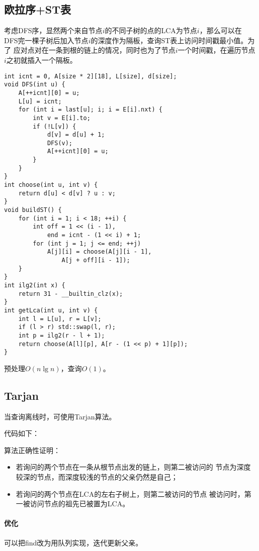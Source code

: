 \subsection{欧拉序+ST表}
考虑DFS序，显然两个来自节点$i$的不同子树的点的LCA为节点$i$，那么可以在
DFS完一棵子树后加入节点$i$的深度作为隔板，查询ST表上访问时间戳最小值。为了
应对点对在一条到根的链上的情况，同时也为了节点$i$一个时间戳，在遍历节点$i$之初就插入一个隔板。
\begin{lstlisting}
int icnt = 0, A[size * 2][18], L[size], d[size];
void DFS(int u) {
    A[++icnt][0] = u;
    L[u] = icnt;
    for (int i = last[u]; i; i = E[i].nxt) {
        int v = E[i].to;
        if (!L[v]) {
            d[v] = d[u] + 1;
            DFS(v);
            A[++icnt][0] = u;
        }
    }
}
int choose(int u, int v) {
    return d[u] < d[v] ? u : v;
}
void buildST() {
    for (int i = 1; i < 18; ++i) {
        int off = 1 << (i - 1),
            end = icnt - (1 << i) + 1;
        for (int j = 1; j <= end; ++j)
            A[j][i] = choose(A[j][i - 1],
                A[j + off][i - 1]);
    }
}
int ilg2(int x) {
    return 31 - __builtin_clz(x);
}
int getLca(int u, int v) {
    int l = L[u], r = L[v];
    if (l > r) std::swap(l, r);
    int p = ilg2(r - l + 1);
    return choose(A[l][p], A[r - (1 << p) + 1][p]);
}
\end{lstlisting}

预处理$O(n\lg n)$，查询$O(1)$。
\subsection{Tarjan}
当查询离线时，可使用Tarjan算法。

代码如下：


算法正确性证明：
\begin{itemize}
    \item 若询问的两个节点在一条从根节点出发的链上，则第二被访问的
    节点为深度较深的节点，而深度较浅的节点的父亲仍然是自己；
    \item 若询问的两个节点在LCA的左右子树上，则第二被访问的节点
    被访问时，第一被访问节点的祖先已被置为LCA。
\end{itemize}

\paragraph{优化} 可以把find改为用队列实现，迭代更新父亲。
